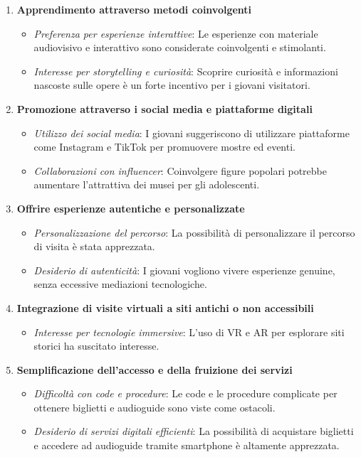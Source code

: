 \documentclass{article}
\begin{document}
\begin{enumerate}
    \item \textbf{Apprendimento attraverso metodi coinvolgenti}
        \begin{itemize}
            \item \textit{Preferenza per esperienze interattive}: Le esperienze con materiale audiovisivo e interattivo sono considerate coinvolgenti e stimolanti.
            \item \textit{Interesse per storytelling e curiosità}: Scoprire curiosità e informazioni nascoste sulle opere è un forte incentivo per i giovani visitatori.
        \end{itemize}

    \item \textbf{Promozione attraverso i social media e piattaforme digitali}
        \begin{itemize}
            \item \textit{Utilizzo dei social media}: I giovani suggeriscono di utilizzare piattaforme come Instagram e TikTok per promuovere mostre ed eventi.
            \item \textit{Collaborazioni con influencer}: Coinvolgere figure popolari potrebbe aumentare l'attrattiva dei musei per gli adolescenti.
        \end{itemize}

    \item \textbf{Offrire esperienze autentiche e personalizzate}
        \begin{itemize}
            \item \textit{Personalizzazione del percorso}: La possibilità di personalizzare il percorso di visita è stata apprezzata.
            \item \textit{Desiderio di autenticità}: I giovani vogliono vivere esperienze genuine, senza eccessive mediazioni tecnologiche.
        \end{itemize}

    \item \textbf{Integrazione di visite virtuali a siti antichi o non accessibili}
        \begin{itemize}
            \item \textit{Interesse per tecnologie immersive}: L'uso di VR e AR per esplorare siti storici ha suscitato interesse.
        \end{itemize}

    \item \textbf{Semplificazione dell'accesso e della fruizione dei servizi}
        \begin{itemize}
            \item \textit{Difficoltà con code e procedure}: Le code e le procedure complicate per ottenere biglietti e audioguide sono viste come ostacoli.
            \item \textit{Desiderio di servizi digitali efficienti}: La possibilità di acquistare biglietti e accedere ad audioguide tramite smartphone è altamente apprezzata.
        \end{itemize}


\end{enumerate}
\end{document}
